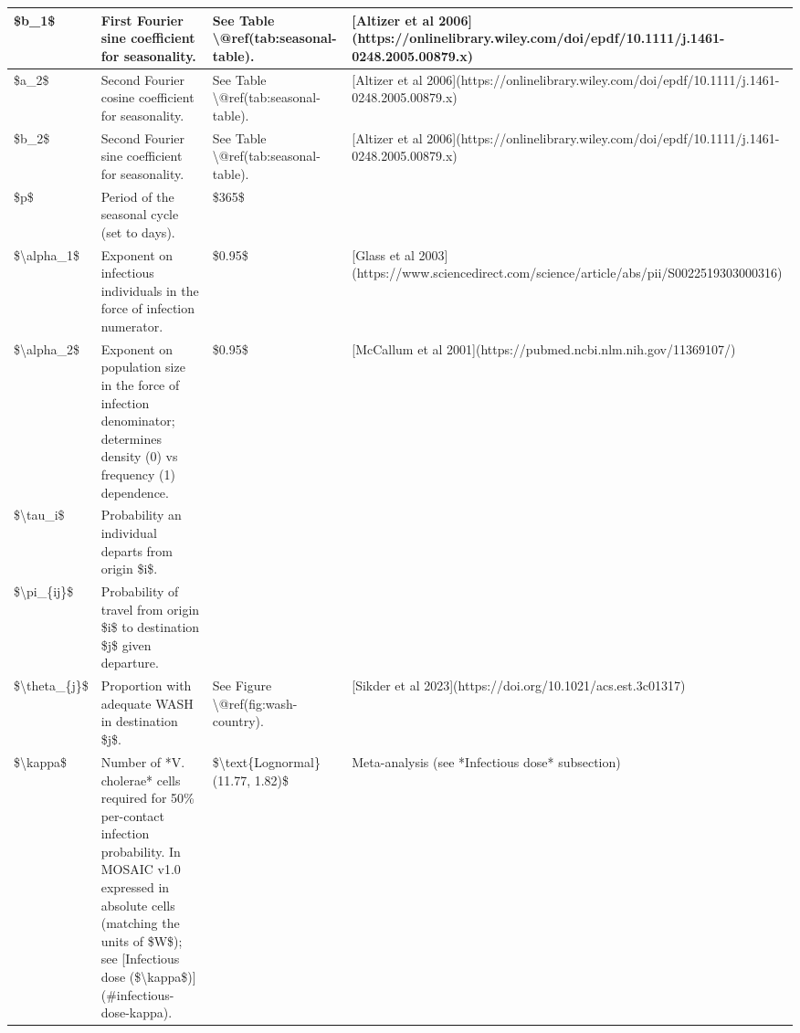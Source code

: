 \documentclass[
]{book}
\begin{document}
\begin{tabular}{l|l|l|l}
\hline
\$b\_1\$ & First Fourier sine coefficient for seasonality. & See Table \textbackslash{}@ref(tab:seasonal-table). & [Altizer et al 2006](https://onlinelibrary.wiley.com/doi/epdf/10.1111/j.1461-0248.2005.00879.x)\\
\hline
\$a\_2\$ & Second Fourier cosine coefficient for seasonality. & See Table \textbackslash{}@ref(tab:seasonal-table). & [Altizer et al 2006](https://onlinelibrary.wiley.com/doi/epdf/10.1111/j.1461-0248.2005.00879.x)\\
\hline
\$b\_2\$ & Second Fourier sine coefficient for seasonality. & See Table \textbackslash{}@ref(tab:seasonal-table). & [Altizer et al 2006](https://onlinelibrary.wiley.com/doi/epdf/10.1111/j.1461-0248.2005.00879.x)\\
\hline
\$p\$ & Period of the seasonal cycle (set to days). & \$365\$ & \\
\hline
\$\textbackslash{}alpha\_1\$ & Exponent on infectious individuals in the force of infection numerator. & \$0.95\$ & [Glass et al 2003](https://www.sciencedirect.com/science/article/abs/pii/S0022519303000316)\\
\hline
\$\textbackslash{}alpha\_2\$ & Exponent on population size in the force of infection denominator; determines density (0) vs frequency (1) dependence. & \$0.95\$ & [McCallum et al 2001](https://pubmed.ncbi.nlm.nih.gov/11369107/)\\
\hline
\$\textbackslash{}tau\_i\$ & Probability an individual departs from origin \$i\$. &  & \\
\hline
\$\textbackslash{}pi\_\{ij\}\$ & Probability of travel from origin \$i\$ to destination \$j\$ given departure. &  & \\
\hline
\$\textbackslash{}theta\_\{j\}\$ & Proportion with adequate WASH in destination \$j\$. & See Figure \textbackslash{}@ref(fig:wash-country). & [Sikder et al 2023](https://doi.org/10.1021/acs.est.3c01317)\\
\hline
\$\textbackslash{}kappa\$ & Number of *V. cholerae* cells required for 50\% per-contact infection probability. In MOSAIC v1.0 expressed in absolute cells (matching the units of \$W\$); see [Infectious dose (\$\textbackslash{}kappa\$)](\#infectious-dose-kappa). & \$\textbackslash{}text\{Lognormal\}(11.77, 1.82)\$ & Meta-analysis (see *Infectious dose* subsection)\\
\hline
\end{tabular}
\end{document}
